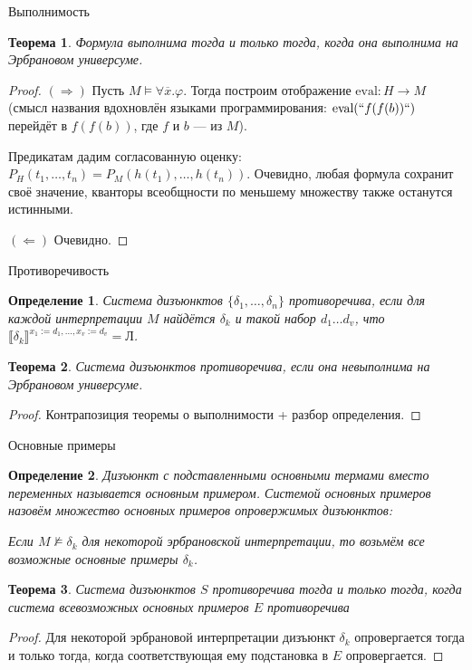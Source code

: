 \documentclass[aspectratio=169]{beamer}
\newtheorem{thm}{Теорема}[section]
\newtheorem{dfn}{Определение}[section]
\begin{document}
\begin{frame}{Выполнимость}
\begin{thm}Формула выполнима тогда и только тогда, когда она выполнима на Эрбрановом универсуме.\end{thm}
\begin{proof}
$(\Rightarrow)$ Пусть $M \models\forall \overline{x}.\varphi$. Тогда построим отображение $\text{eval}: H \rightarrow M$
(смысл названия вдохновлён языками программирования: $\text{eval}(``f(f(b))``)$ перейдёт в $f(f(b))$, где $f$ и $b$ --- из $M$).

Предикатам дадим согласованную оценку:
$P_H(t_1,\dots,t_n) = P_M(h(t_1),\dots,h(t_n))$. Очевидно, любая формула сохранит своё значение, кванторы всеобщности
по меньшему множеству также останутся истинными.

$(\Leftarrow)$ Очевидно.
\end{proof}\end{frame}

\begin{frame}{Противоречивость}
\begin{dfn}Система дизъюнктов $\{\delta_1,\dots,\delta_n\}$ противоречива,
если для каждой интерпретации $M$ найдётся $\delta_k$ и такой набор $d_1\dots d_v$,
что $\llbracket\delta_k\rrbracket^{x_1 := d_1, \dots, x_v := d_v} = \text{Л}$.\end{dfn}
\begin{thm}Система дизъюнктов противоречива, если она невыполнима на Эрбрановом универсуме.\end{thm}
\begin{proof}Контрапозиция теоремы о выполнимости + разбор определения.
\end{proof}
\end{frame}

\begin{frame}{Основные примеры}
\begin{dfn}
Дизъюнкт с подставленными основными термами вместо переменных называется основным примером.
Системой основных примеров назовём множество основных примеров опровержимых дизъюнктов:

Если $M \not\models \delta_k$ для некоторой эрбрановской интерпретации, то
возьмём все возможные основные примеры $\delta_k$.
\end{dfn}

\begin{thm}Система дизъюнктов $S$ противоречива тогда и только тогда, когда система всевозможных
основных примеров $E$ противоречива\end{thm}
\begin{proof}Для некоторой эрбрановой интерпретации дизъюнкт $\delta_k$
опровергается тогда и только тогда, когда соответствующая ему подстановка в $E$ опровергается.
\end{proof}\end{frame}
\end{document}

